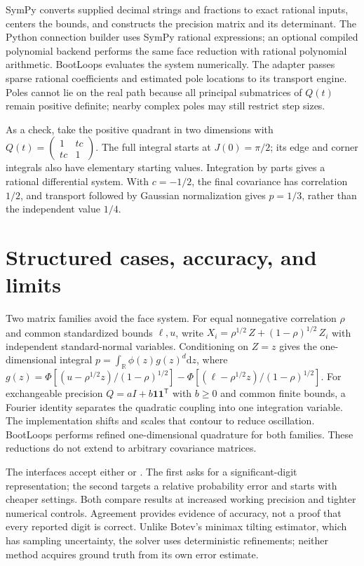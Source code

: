 \documentclass[aps,pra,onecolumn,11pt,tightenlines,notitlepage,nofootinbib]{revtex4-2}
\newcommand{\dd}{\mathrm{d}}
\newcommand{\one}{\mathbf{1}}
\newcommand{\code}[1]{\texttt{\detokenize{#1}}}
\begin{document}
SymPy converts supplied decimal strings and fractions to exact rational
inputs, centers the bounds, and constructs the precision matrix and its
determinant\cite{sympy}. The Python connection builder uses SymPy rational
expressions; an optional compiled polynomial backend performs the same face
reduction with rational polynomial arithmetic. BootLoops evaluates the
system numerically. The adapter passes sparse rational coefficients and
estimated pole locations to its transport engine. Poles cannot lie on the
real path because all principal submatrices of $Q(t)$ remain positive
definite; nearby complex poles may still restrict step sizes.

As a check, take the positive quadrant in two dimensions with
$Q(t)=\left(\begin{smallmatrix}1&tc\\tc&1\end{smallmatrix}\right)$.
The full integral starts at $J(0)=\pi/2$; its edge and corner integrals
also have elementary starting values. Integration by parts gives a rational
differential system. With $c=-1/2$, the final covariance has correlation
$1/2$, and transport followed by Gaussian normalization gives $p=1/3$,
rather than the independent value $1/4$.

\section{Structured cases, accuracy, and limits}
Two matrix families avoid the face system. For equal nonnegative correlation
$\rho$ and common standardized bounds $\ell,u$, write
$X_i=\rho^{1/2}\,Z+(1-\rho)^{1/2}\,Z_i$ with independent standard-normal
variables. Conditioning on $Z=z$ gives the one-dimensional integral
$p=\int_{\mathbb R}\phi(z)g(z)^d\dd z$, where
$g(z)=\Phi[(u-\rho^{1/2}z)/(1-\rho)^{1/2}]
-\Phi[(\ell-\rho^{1/2}z)/(1-\rho)^{1/2}]$.
For exchangeable precision $Q=aI+b\one\one^{\mathsf T}$ with $b\geq0$
and common finite bounds, a Fourier identity separates the quadratic
coupling into one integration variable\cite{hubbard}. The implementation
shifts and scales that contour to reduce oscillation. BootLoops performs
refined one-dimensional quadrature for both families. These reductions do
not extend to arbitrary covariance matrices.

The interfaces accept either \code{digits} or \code{rtol}. The first asks
for a significant-digit representation; the second targets a relative
probability error and starts with cheaper settings. Both compare results
at increased working precision and tighter numerical controls. Agreement
provides evidence of accuracy, not a proof that every reported digit is
correct. Unlike Botev's minimax tilting estimator, which has sampling
uncertainty\cite{botev}, the solver uses deterministic refinements; neither
method acquires ground truth from its own error estimate.
\end{document}
